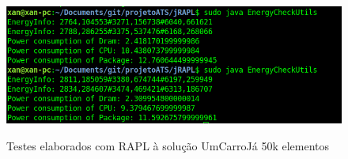 \begin{itemize}
        \begin{figure}[H]
            \hbox{\hspace{-8em} \includegraphics[width=1.4\textwidth]{images/rapl_50k_v1.png}}
            \label{fig55}
            \caption{Testes elaborados com RAPL à solução UmCarroJá 50k elementos}
        \end{figure}
        

\end{itemize}

\newpage
